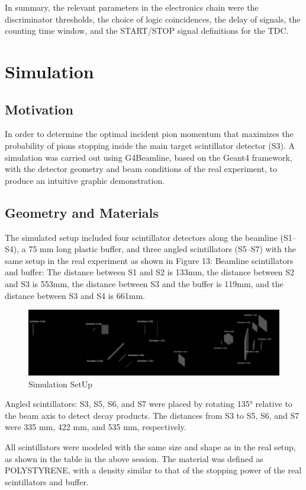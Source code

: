 \documentclass[11pt,a4paper]{article}
\begin{document}
In summary, the relevant parameters in the electronics chain were the discriminator thresholds, the choice of logic coincidences, the delay of signals, the counting time window, and the START/STOP signal definitions for the TDC.

\section{Simulation}


\subsection{Motivation}
In order to determine the optimal incident pion momentum that maximizes the probability of pions stopping inside the main target scintillator detector (S3).
A simulation was carried out using G4Beamline, based on the Geant4 framework, with the detector geometry and beam conditions of the real experiment, to produce an intuitive graphic demonstration. 

\subsection{Geometry and Materials}
The simulated setup included four scintillator detectors along the beamline (S1–S4), a 75 mm long plastic buffer, and three angled scintillators (S5–S7) with the same setup in the real experiment as shown in Figure 13:
Beamline scintillators and buffer: The distance between S1 and S2 is 133mm, the distance between S2 and S3 is 553mm, the distance between S3 and the buffer is 119mm, and the distance between S3 and S4 is 661mm.
\begin{figure}[h]
\centering
\includegraphics[width=0.70\linewidth]{1setup.JPEG}
\caption{Simulation SetUp}
\label{STOPscope}
\end{figure}

Angled scintillators: S3, S5, S6, and S7 were placed by rotating 135° relative to the beam axis to detect decay products. The distances from S3 to S5, S6, and S7 were 335 mm, 422 mm, and 535 mm, respectively.

All scintillators were modeled with the same size and shape as in the real setup, as shown in the table in the above session. The material was defined as POLYSTYRENE, with a density similar to that of the stopping power of the real scintillators and buffer.
\end{document}
